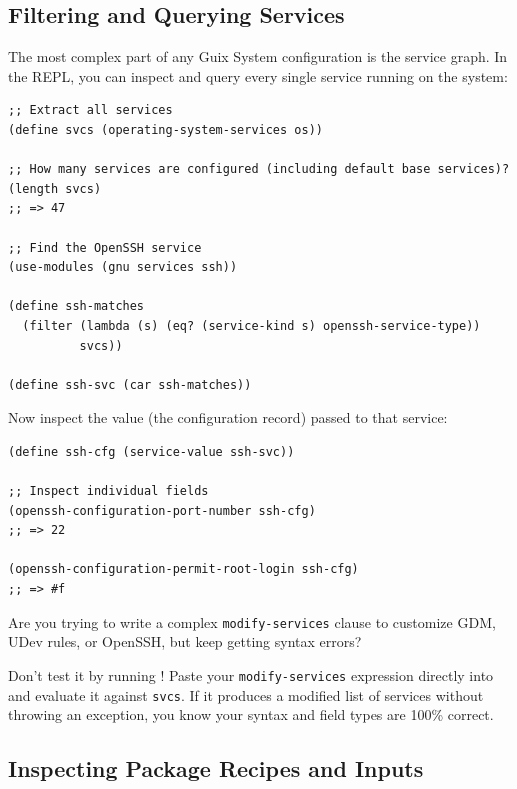 \subsection{Filtering and Querying Services}

The most complex part of any Guix System configuration is the service graph. In the REPL, you can inspect and query every single service running on the system:

\begin{lstlisting}[style=guixscheme]
;; Extract all services
(define svcs (operating-system-services os))

;; How many services are configured (including default base services)?
(length svcs)
;; => 47

;; Find the OpenSSH service
(use-modules (gnu services ssh))

(define ssh-matches
  (filter (lambda (s) (eq? (service-kind s) openssh-service-type))
          svcs))

(define ssh-svc (car ssh-matches))
\end{lstlisting}

Now inspect the value (the configuration record) passed to that service:
\begin{lstlisting}[style=guixscheme]
(define ssh-cfg (service-value ssh-svc))

;; Inspect individual fields
(openssh-configuration-port-number ssh-cfg)
;; => 22

(openssh-configuration-permit-root-login ssh-cfg)
;; => #f
\end{lstlisting}

\begin{protipbox}
Are you trying to write a complex \texttt{modify-services} clause to customize GDM, UDev rules, or OpenSSH, but keep getting syntax errors?

Don't test it by running ! Paste your \texttt{modify-services} expression directly into  and evaluate it against \texttt{svcs}. If it produces a modified list of services without throwing an exception, you know your syntax and field types are 100\% correct.
\end{protipbox}

\subsection{Inspecting Package Recipes and Inputs}

